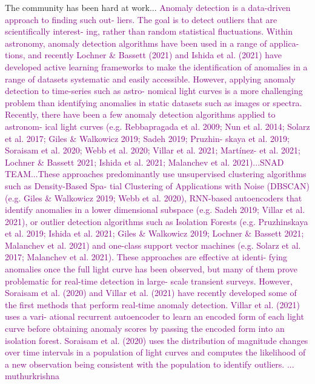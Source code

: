 \documentclass[twocolumn]{aastex63}
\newcommand{\pat}{\textcolor{purple}}
\begin{document}
The community has been hard at work... \pat{Anomaly detection is a data-driven approach to finding such out- liers. The goal is to detect outliers that are scientifically interest- ing, rather than random statistical fluctuations. Within astronomy, anomaly detection algorithms have been used in a range of applica- tions, and recently Lochner \& Bassett (2021) and Ishida et al. (2021) have developed active learning frameworks to make the identification of anomalies in a range of datasets systematic and easily accessible.
However, applying anomaly detection to time-series such as astro- nomical light curves is a more challenging problem than identifying anomalies in static datasets such as images or spectra. Recently, there have been a few anomaly detection algorithms applied to astronom- ical light curves (e.g. Rebbapragada et al. 2009; Nun et al. 2014; Solarz et al. 2017; Giles \& Walkowicz 2019; Sadeh 2019; Pruzhin- skaya et al. 2019; Soraisam et al. 2020; Webb et al. 2020; Villar et al. 2021; Martínez-\citep{Galarza2021} et al. 2021; Lochner \& Bassett 2021; Ishida et al. 2021; Malanchev et al. 2021)...SNAD TEAM...These approaches predominantly use unsupervised clustering algorithms such as Density-Based Spa- tial Clustering of Applications with Noise (DBSCAN) (e.g. Giles \& Walkowicz 2019; Webb et al. 2020), RNN-based autoencoders that identify anomalies in a lower dimensional subspace (e.g. Sadeh 2019; Villar et al. 2021), or outlier detection algorithms such as Isolation Forests (e.g. Pruzhinskaya et al. 2019; Ishida et al. 2021; Giles \& Walkowicz 2019; Lochner \& Bassett 2021; Malanchev et al. 2021) and one-class support vector machines (e.g. Solarz et al. 2017; Malanchev et al. 2021). These approaches are effective at identi- fying anomalies once the full light curve has been observed, but many of them prove problematic for real-time detection in large- scale transient surveys. However, Soraisam et al. (2020) and Villar et al. (2021) have recently developed some of the first methods that perform real-time anomaly detection. Villar et al. (2021) uses a vari- ational recurrent autoencoder to learn an encoded form of each light curve before obtaining anomaly scores by passing the encoded form into an isolation forest. Soraisam et al. (2020) uses the distribution of magnitude changes over time intervals in a population of light curves and computes the likelihood of a new observation being consistent with the population to identify outliers. ... muthurkrishna}
\end{document}
